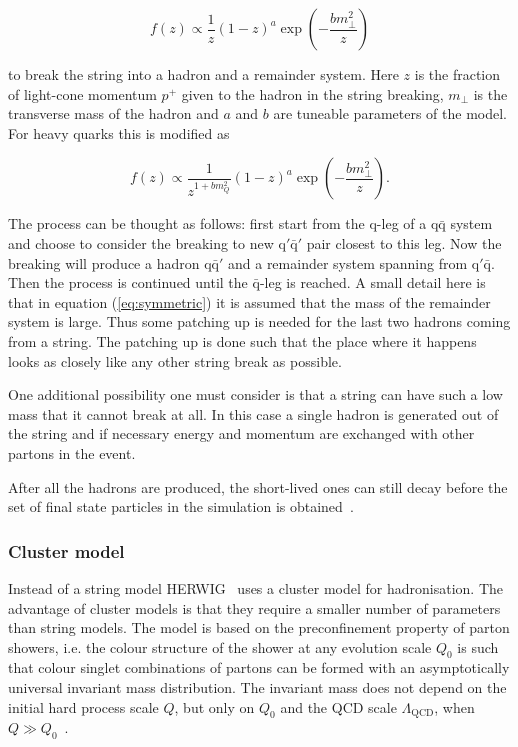 \begin{equation}
f\left(z\right) \propto \frac{1}{z} \left(1-z\right)^a \exp \left(-\frac{b m_\perp ^2}{z} \right)
\label{eq:symmetric}
\end{equation}

\noindent to break the string into a hadron and a remainder system. Here $z$ is the fraction of light-cone momentum $p^+$ given to the hadron in the string breaking, $m_\perp$ is the transverse mass of the hadron and $a$ and $b$ are tuneable parameters of the model. For heavy quarks this is modified as 

\begin{equation}
f\left(z\right) \propto \frac{1}{z^{1+bm_Q^2}} \left(1-z\right)^a \exp \left(-\frac{b m_\perp ^2}{z} \right).
\label{eq:symmetric2}
\end{equation}

\noindent The process can be thought as follows: first start from the q-leg of a $\mathrm{q \bar{q}}$ system and choose to consider the breaking to new $\mathrm{q' \bar q'}$ pair closest to this leg. Now the breaking will produce a hadron $\mathrm{q \bar{q}'}$ and a remainder system spanning from $\mathrm{q' \bar{q}}$. Then the process is continued until the $\bar{\mathrm{q}}$-leg is reached. A small detail here is that in equation (\ref{eq:symmetric}) it is assumed that the mass of the remainder system is large. Thus some patching up is needed for the last two hadrons coming from a string. The patching up is done such that the place where it happens looks as closely like any other string break as possible.


One additional possibility one must consider is that a string can have such a low mass that it cannot break at all. In this case a single hadron is generated out of the string and if necessary  energy and momentum are exchanged with other partons in the event.

After all the hadrons are produced, the short-lived ones can still decay before the set of final state particles in the simulation is obtained~\cite{introPythia82}.


\subsubsection*{Cluster model}
Instead of a string model HERWIG~\cite{herwigManual} uses a cluster model for hadronisation. The advantage of cluster models is that they require a smaller number of parameters than string models. The model is based on the preconfinement property of parton showers, i.e. the colour structure of the shower at any evolution scale $Q_0$ is such that colour singlet combinations of partons can be formed with an asymptotically universal invariant mass distribution. The invariant mass does not depend on the initial hard process scale $Q$, but only on $Q_0$ and the QCD scale $\Lambda _ \mathrm{QCD}$, when $Q \gg Q_0$~\cite{eventGenerators}.

